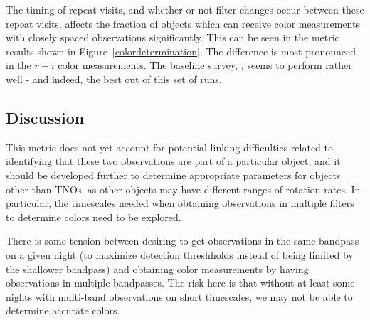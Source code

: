 The timing of repeat visits, and whether or not filter changes occur
between these repeat visits, affects the fraction of objects which can
receive color measurements with closely spaced observations
significantly. This can be seen in the metric results shown in
Figure~\ref{colordetermination}. The difference is most pronounced in
the $r-i$ color measurements. The baseline survey,
, seems to perform rather well - and
indeed, the best out of this set of runs.



\subsection{Discussion}
\label{sec:\secname:discussion}

This metric does not yet account for potential linking difficulties
related to identifying that these two observations are part of a
particular object, and it should be developed further to determine
appropriate parameters for objects other than TNOs, as other objects
may have different ranges of rotation rates. In particular, the
timescales needed when obtaining observations in multiple filters to
determine colors need to be explored.

There is some tension between desiring to get observations in the same
bandpass on a given night (to maximize detection threshholds instead
of being limited by the shallower bandpass) and obtaining color
measurements by having observations in multiple bandpasses. The risk
here is that without at least some nights with multi-band observations
on short timescales, we may not be able to determine accurate colors.


\navigationbar
